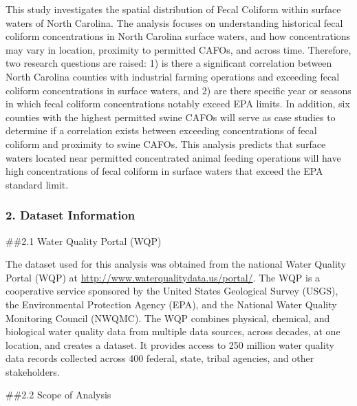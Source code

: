 \documentclass[12pt,]{article}
\begin{document}
This study investigates the spatial distribution of Fecal Coliform
within surface waters of North Carolina. The analysis focuses on
understanding historical fecal coliform concentrations in North Carolina
surface waters, and how concentrations may vary in location, proximity
to permitted CAFOs, and across time. Therefore, two research questions
are raised: 1) is there a significant correlation between North Carolina
counties with industrial farming operations and exceeding fecal coliform
concentrations in surface waters, and 2) are there specific year or
seasons in which fecal coliform concentrations notably exceed EPA
limits. In addition, six counties with the highest permitted swine CAFOs
will serve as case studies to determine if a correlation exists between
exceeding concentrations of fecal coliform and proximity to swine CAFOs.
This analysis predicts that surface waters located near permitted
concentrated animal feeding operations will have high concentrations of
fecal coliform in surface waters that exceed the EPA standard limit.

\newpage

\hypertarget{dataset-information}{%
\subsubsection{2. Dataset Information}\label{dataset-information}}

\#\#2.1 Water Quality Portal (WQP)

The dataset used for this analysis was obtained from the national Water
Quality Portal (WQP) at \url{http://www.waterqualitydata.us/portal/}.
The WQP is a cooperative service sponsored by the United States
Geological Survey (USGS), the Environmental Protection Agency (EPA), and
the National Water Quality Monitoring Council (NWQMC). The WQP combines
physical, chemical, and biological water quality data from multiple data
sources, across decades, at one location, and creates a dataset. It
provides access to 250 million water quality data records collected
across 400 federal, state, tribal agencies, and other stakeholders.

\#\#2.2 Scope of Analysis
\end{document}
